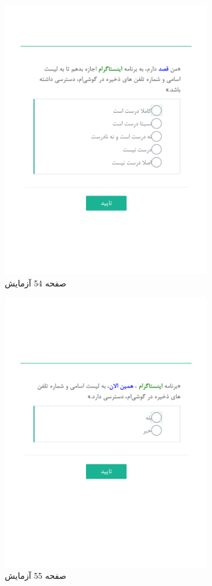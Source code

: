 { 
\begin{figure}[htpb]
\centering
\includegraphics[width=0.8\textwidth]{./img/Task54.png/}
\caption{ صفحه 54 آزمایش }
\label{fig:Task54}
\end{figure}
 
 
\begin{figure}[htpb]
\centering
\includegraphics[width=0.8\textwidth]{./img/Task55.png/}
\caption{ صفحه 55 آزمایش }
\label{fig:Task55}
\end{figure}
 
}
